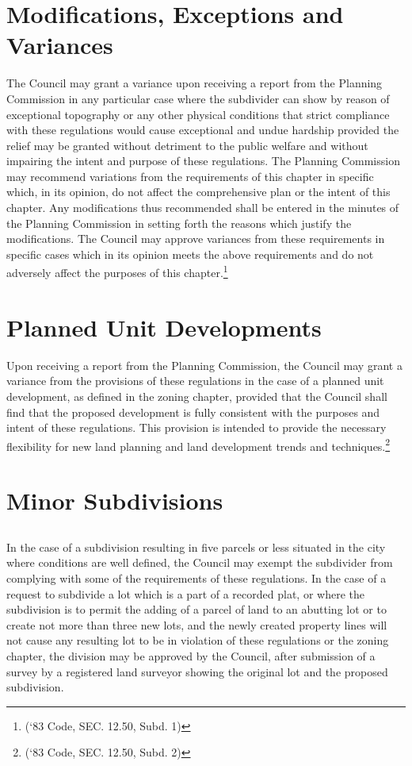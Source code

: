 \section{Modifications, Exceptions and Variances}
The Council may grant a variance upon receiving a report from the Planning Commission in any particular case where the subdivider can show by reason of exceptional topography or any other physical conditions that strict compliance with these regulations would cause exceptional and undue hardship provided the relief may be granted without detriment to the public welfare and without impairing the intent and purpose of these regulations. The Planning Commission may recommend variations from the requirements of this chapter in specific which, in its opinion, do not affect the comprehensive plan or the intent of this chapter.  Any modifications thus recommended shall be entered in the minutes of the Planning Commission in setting forth the reasons which justify the modifications.  The Council may approve variances from these requirements in specific cases which in its opinion meets the above requirements and do not adversely affect the purposes of this chapter.\footnote{(‘83 Code, SEC. 12.50, Subd. 1)}

\section{Planned Unit Developments}
Upon receiving a report from the Planning Commission, the Council may grant a variance from the provisions of these regulations in the case of a planned unit development, as defined in the zoning chapter, provided that the Council shall find that the proposed development is fully consistent with the purposes and intent of these regulations. This provision is intended to provide the necessary flexibility for new land planning and land development trends and techniques.\footnote{(‘83 Code, SEC. 12.50, Subd. 2)}

\section{Minor Subdivisions}
\subsection{}
In the case of a subdivision resulting in five parcels or less situated in the city where conditions are well defined, the Council may exempt the subdivider from complying with some of the requirements of these regulations. In the case of a request to subdivide a lot which is a part of a recorded plat, or where the subdivision is to permit the adding of a parcel of land to an abutting lot or to create not more than three new lots, and the newly created property lines will not cause any resulting lot to be in violation of these regulations or the zoning chapter, the division may be approved by the Council, after submission of a survey by a registered land surveyor showing the original lot and the proposed subdivision.
